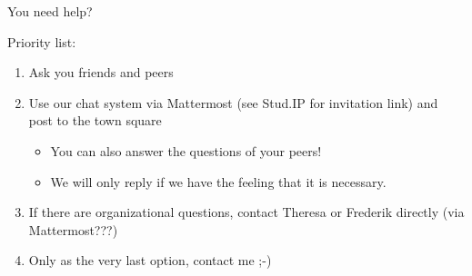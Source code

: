 \begin{frame}[c]{You need help?}
	
Priority list:
	\begin{enumerate}
		\item Ask you friends and peers
		\item Use our chat system via Mattermost (see Stud.IP for invitation link) and post to the town square
		\begin{itemize}
			\item You can also answer the questions of your peers! 
			\item We will only reply if we have the feeling that it is necessary.
		\end{itemize}
		\item If there are organizational questions, contact Theresa or Frederik directly (via Mattermost???)
		\item Only as the very last option, contact me ;-)
	\end{enumerate}
	
\end{frame}
